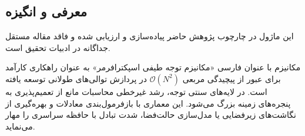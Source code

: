 \subsection{معرفی و انگیزه}
این ماژول در چارچوب پژوهش حاضر پیاده‌سازی و ارزیابی شده و فاقد مقاله مستقل جداگانه در ادبیات تحقیق است.

مکانیزم  با عنوان فارسی «مکانیزم توجه طیفی اسپکترافرمر» به عنوان راهکاری کارآمد برای عبور از پیچیدگی مربعی $\mathcal{O}(N^2)$ در پردازش توالی‌های طولانی توسعه یافته است. در لایه‌های سنتی توجه، رشد غیرخطی محاسبات مانع از تعمیم‌پذیری به پنجره‌های زمینه بزرگ می‌شود. این معماری با بازفرمول‌بندی معادلات و بهره‌گیری از نگاشت‌های زیرفضایی یا مدل‌سازی حالت‌فضا، شدت تبادل با حافظه سراسری را مهار می‌نماید.
